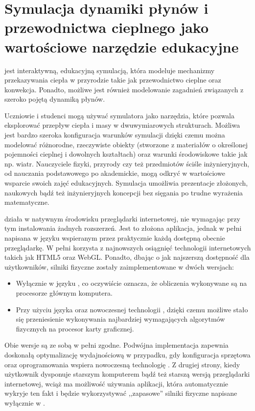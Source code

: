 \chapter{Symulacja dynamiki płynów i przewodnictwa cieplnego jako wartościowe narzędzie edukacyjne}

\en jest interaktywną, edukacyjną symulacją, która modeluje mechanizmy
przekazywania ciepła w przyrodzie takie jak przewodnictwo cieplne oraz
konwekcja. Ponadto, możliwe jest również modelowanie zagadnień związanych z
szeroko pojętą dynamiką płynów.

Uczniowie i studenci mogą używać symulatora \en jako narzędzia, które pozwala
eksplorować przepływ ciepła i masy w dwuwymiarowych strukturach. Możliwa jest
bardzo szeroka konfiguracja warunków symulacji dzięki czemu można modelować
różnorodne, rzeczywiste obiekty (stworzone z materiałów o określonej pojemności
cieplnej i dowolnych kształtach) oraz warunki środowiskowe takie jak np. wiatr.
Nauczyciele fizyki, przyrody czy też przedmiotów ściśle inżynieryjnych, od
nauczania podstawowego po akademickie, mogą odkryć w \en wartościowe wsparcie
swoich zajęć edukacyjnych. Symulacja umożliwia prezentacje złożonych, naukowych
bądź też inżynieryjnych koncepcji bez sięgania po trudne wyrażenia matematyczne.

\en działa w natywnym środowisku przeglądarki internetowej, nie wymagając przy
tym instalowania żadnych rozszerzeń. Jest to złożona aplikacja, jednak w pełni
napisana w języku \js wspieranym przez praktycznie każdą dostępną obecnie
przeglądarkę. W pełni korzysta z najnowszych osiągnięć technologii internetowych
takich jak HTML5 oraz WebGL. Ponadto, dbając o jak najszerszą dostępność dla
użytkowników, silniki fizyczne zostały zaimplementowane w dwóch wersjach:

\begin{itemize} 

\item Wyłącznie w języku \js, co oczywiście oznacza, że obliczenia wykonywane są
na procesorze głównym komputera.

\item Przy użyciu języka \js oraz nowoczesnej technologii , dzięki
czemu możliwe stało się przeniesienie wykonywania najbardziej wymagających
algorytmów fizycznych na procesor karty graficznej.

\end{itemize}

Obie wersje są ze sobą w pełni zgodne. Podwójna implementacja zapewnia doskonałą
optymalizację wydajnościową w przypadku, gdy konfiguracja sprzętowa oraz
oprogramowania wspiera nowoczesną technologię . Z drugiej strony,
kiedy użytkownik dysponuje starszym komputerem bądź też starszą wersją
przeglądarki internetowej, wciąż ma możliwość używania aplikacji, która
automatycznie wykryje ten fakt i będzie wykorzystywać ,,zapasowe'' silniki
fizyczne napisane wyłącznie w \js.

